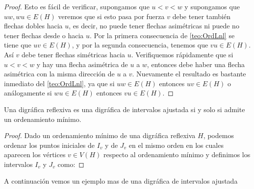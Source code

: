 \begin{proof}
    Esto es fácil de verificar, supongamos que $u<v<w$ y supongamos que $uw,wu\in E(H)$ veremos que si esto pasa por fuerza $v$ debe tener también flechas dobles hacia $u$, es decir, no puede tener flechas asimétricas ni puede no tener flechas desde o hacia $u$.
    Por la primera consecuencia de \cref{teo:OrdLnl} se tiene que $uv\in E(H)$, y por la segunda consecuencia, tenemos que $vu\in E(H)$. Así $v$ debe tener flechas simétricas hacia $u$. 
    Verifiquemos rápidamente que si $u<v<w$ y hay una flecha asimétrica de $u$ a $w$, entonces debe haber una flecha asimétrica con la misma dirección de $u$ a $v$. Nuevamente el resultado es bastante inmediato del \cref{teo:OrdLnl}, ya que si $uw\in E(H)$ entonces $uv\in E(H)$ o análogamente si $wu\in E(H)$ entonces $vu\in E(H)$.
\end{proof}

\begin{teorema}
    Una digráfica reflexiva es una digráfica de intervalos ajustada si y solo si admite un ordenamiento mínimo.
\end{teorema}

\begin{proof}
    Dado un ordenamiento mínimo de una digráfica reflexiva $H$, podemos ordenar los puntos iniciales de $I_v$ y de $J_v$ en el mismo orden en los cuales aparecen los vértices $v\in V(H)$ respecto al ordenamiento mínimo y definimos los intervalos $I_v$ y $J_v$ como:
\end{proof}
A continuación vemos un ejemplo mas de una digráfica de intervalos ajustada